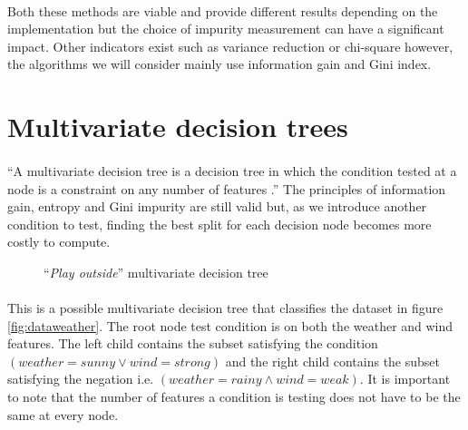 \documentclass[12pt]{report}
\theoremstyle{definition}
\theoremstyle{definition}
\theoremstyle{definition}
\begin{document}
\paragraph{} Both these methods are viable and provide different results depending on the implementation but
the choice of impurity measurement can have a significant impact. Other indicators exist such as variance 
reduction or chi-square however, the algorithms we will consider mainly use information gain and Gini index.


\section{Multivariate decision trees}
\paragraph{} ``A multivariate decision tree is a decision tree in which the condition tested at a node is a 
constraint on any number of features \cite{multivariate-explaining}.'' The principles of information gain,
entropy and Gini impurity are still valid but, as we introduce another condition to test, finding the best
split for each decision node becomes more costly to compute.

\begin{figure}[ht]
    \centering
    \caption{``\textit{Play outside}'' multivariate decision tree}
    \label{fig:multitree}
\end{figure}

\paragraph{} This is a possible multivariate decision tree that classifies the dataset in figure \ref{fig:dataweather}.
The root node test condition is on both the weather and wind features. The left child contains the subset
satisfying the condition $(weather=sunny \lor wind=strong)$ and the right child contains the subset satisfying
the negation i.e. $(weather=rainy \land wind=weak)$. It is important to note that the number of features a
condition is testing does not have to be the same at every node.
\end{document}
